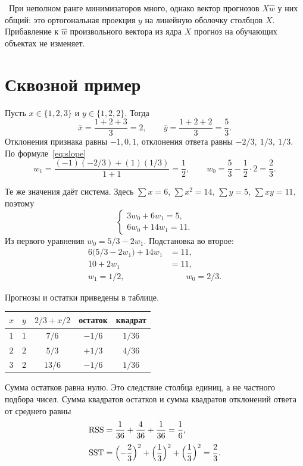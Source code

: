 \documentclass[11pt,a4paper]{article}
\newcommand{\Rem}{\par\noindent{\color{navy}\textbf{Замечание.}}\ }
\begin{document}
\Rem При неполном ранге минимизаторов много, однако вектор прогнозов \(X\hat w\) у них общий: это ортогональная проекция \(y\) на линейную оболочку столбцов \(X\). Прибавление к \(\hat w\) произвольного вектора из ядра \(X\) прогноз на обучающих объектах не изменяет.

\section{Сквозной пример}

Пусть \(x\in\{1,2,3\}\) и \(y\in\{1,2,2\}\). Тогда
\[
\bar x=\frac{1+2+3}{3}=2,\qquad
\bar y=\frac{1+2+2}{3}=\frac{5}{3}.
\]
Отклонения признака равны \(-1,0,1\), отклонения ответа равны \(-2/3,\ 1/3,\ 1/3\). По формуле~\eqref{eq:slope}
\[
w_1=\frac{(-1)(-2/3)+(1)(1/3)}{1+1}=\frac{1}{2},\qquad
w_0=\frac{5}{3}-\frac12\cdot 2=\frac{2}{3}.
\]

Те же значения даёт система. Здесь \(\sum x=6\), \(\sum x^{2}=14\), \(\sum y=5\), \(\sum xy=11\), поэтому
\[
\begin{cases}
3w_0+6w_1=5,\\
6w_0+14w_1=11.
\end{cases}
\]
Из первого уравнения \(w_0=5/3-2w_1\). Подстановка во второе:
\begin{align*}
6\bigl(5/3-2w_1\bigr)+14w_1&=11,\\
10+2w_1&=11,\\
w_1=1/2,&\qquad w_0=2/3.
\end{align*}

Прогнозы и остатки приведены в таблице.

\begin{center}
\begin{tabular}{@{}ccccc@{}}
\toprule
\(x\) & \(y\) & \(2/3+x/2\) & остаток & квадрат\\
\midrule
\(1\) & \(1\) & \(7/6\) & \(-1/6\) & \(1/36\)\\
\(2\) & \(2\) & \(5/3\) & \(+1/3\) & \(4/36\)\\
\(3\) & \(2\) & \(13/6\) & \(-1/6\) & \(1/36\)\\
\bottomrule
\end{tabular}
\end{center}

Сумма остатков равна нулю. Это следствие столбца единиц, а не частного подбора чисел. Сумма квадратов остатков и сумма квадратов отклонений ответа от среднего равны
\begin{align*}
\mathrm{RSS}&=\frac{1}{36}+\frac{4}{36}+\frac{1}{36}=\frac{1}{6},\\[1mm]
\mathrm{SST}&=\Bigl(-\frac23\Bigr)^{2}+\Bigl(\frac13\Bigr)^{2}+\Bigl(\frac13\Bigr)^{2}=\frac{2}{3}.
\end{align*}
\end{document}
